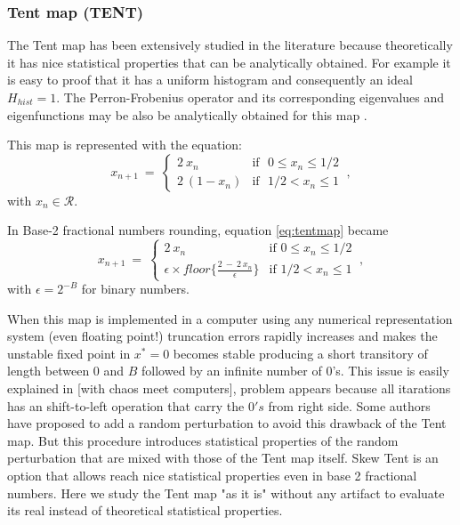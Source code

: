 \subsubsection{Tent map (TENT)} \label{sssec:tent}

The Tent map has been extensively studied in the literature because theoretically it has nice  statistical properties that can be analytically obtained. For example it is easy to proof that it has a uniform histogram and consequently an ideal $H_{hist}=1$. The Perron-Frobenius operator and its corresponding eigenvalues and eigenfunctions may be also be analytically obtained for this map \cite{tent}. 

This map is represented with the equation:
\begin{equation}\label{eq:tentmap}
x_{n+1}~=~ \left\{ \begin{array}{ll}
2~{x_n} & \textrm{if ~$0\leq x_n\leq 1/2$}\\
2~(1-{x_n}) & \textrm{if ~$1/2<x_n\leq 1$} 
\end{array} \right.  \ ,
\end{equation}
with $x_n\in\mathcal{R}$.

In Base-2 fractional numbers rounding, equation \ref{eq:tentmap} became
\begin{equation}\label{eq:tentdecbin}
x_{n+1}~=~ \left\{ \begin{array}{ll}
2~{x_n} & \textrm{if $0\leq x_n\leq 1/2$}\\
\epsilon \times floor\{\frac{2~-~2~x_n}{\epsilon}\} & \textrm{if $1/2<x_n\leq 1$} 
\end{array} \right.  \ ,
\end{equation}
with $\epsilon=2^{-B}$ for binary numbers.

When this map is implemented in a computer using any numerical representation system (even floating point!) truncation errors rapidly increases and makes the unstable fixed point in $x^*=0$ becomes stable producing a short transitory of length between $0$ and $B$ followed by an infinite number of  $0$'s\cite{Jessa1993,Callegari1997}.
This issue is easily explained in [with chaos meet computers], problem appears because all itarations has an shift-to-left operation that carry the $0's$ from right side.
Some authors \cite{buscar} have proposed to add a random perturbation to avoid this drawback of the Tent map. But this procedure introduces statistical properties of the random perturbation that are mixed with those of the Tent map itself.
Skew Tent is an option that allows reach nice statistical properties even in base 2 fractional numbers.
Here we study the Tent map "as it is" without any artifact to evaluate its real instead of theoretical statistical properties. 

